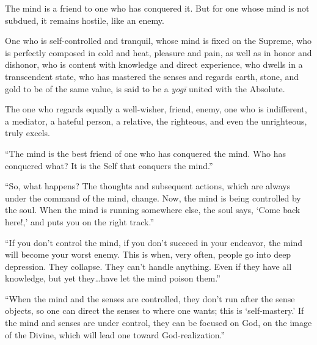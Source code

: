 {The mind is a friend to one who has conquered it. But for one whose mind is not subdued, it remains hostile, like an enemy.}

{One who is self-controlled and tranquil, whose mind is fixed on the Supreme, who is perfectly composed in cold and heat, pleasure and pain, as well as in honor and dishonor, who is content with knowledge and direct experience, who dwells in a transcendent state, who has mastered the senses and regards earth, stone, and gold to be of the same value, is said to be a \textit{yogī} united with the Absolute.}

{The one who regards equally a well-wisher, friend, enemy, one who is indifferent, a mediator, a hateful person, a relative, the righteous, and even the unrighteous, truly excels.}

\enquote{The mind is the best friend of one who has conquered the mind. Who has conquered what? It is the Self that conquers the mind.}

\enquote{So, what happens? The thoughts and subsequent actions, which are always under the command of the mind, change. Now, the mind is being controlled by the soul. When the mind is running somewhere else, the soul says, \enquote{Come back here!,} and puts you on the right track.}

\enquote{If you don’t control the mind, if you don’t succeed in your endeavor, the mind will become your worst enemy. This is when, very often, people go into deep depression. They collapse. They can’t handle anything. Even if they have all knowledge, but yet they\ldots have let the mind poison them.}

\enquote{When the mind and the senses are controlled, they don’t run after the sense objects, so one can direct the senses to where one wants; this is \enquote{self-mastery.} If the mind and senses are under control, they can be focused on God, on the image of the Divine, which will lead one toward God-realization.}

